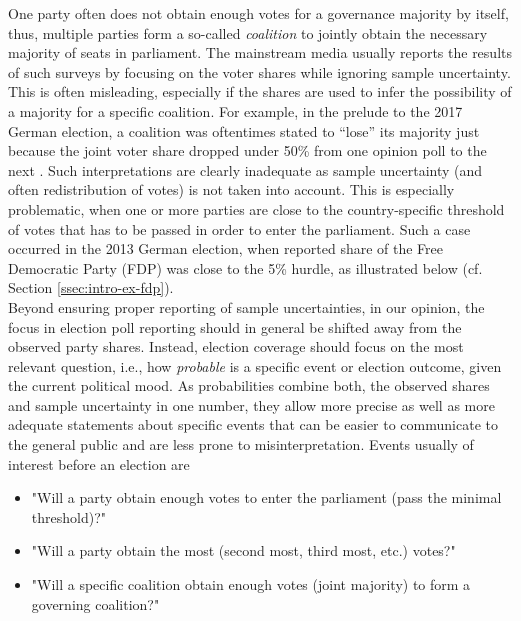 \documentclass[smallcondensed]{svjour3}     %
\begin{document}
One party often does not obtain enough
votes for a governance majority by itself, thus, multiple parties form a so-called
\emph{coalition} to jointly obtain the necessary majority of seats in parliament.
The mainstream media usually reports the results of such surveys by focusing
on the voter shares while ignoring sample uncertainty. This is often misleading,
especially if the shares are used to infer the possibility of a majority for
a specific coalition. For example, in the prelude to the 2017 German election,
a coalition was oftentimes stated to ``lose'' its majority just because the joint
voter share dropped under 50\% from one opinion poll to the next \citep[cf.][]{umfrage_2017}.
Such interpretations are clearly inadequate as sample uncertainty
(and often redistribution of votes) is not taken into account. This is especially
problematic, when one or more parties are close to the country-specific threshold
of votes that has to be passed in order to enter the parliament. Such a case
occurred in the 2013 German election, when reported share of the Free Democratic
Party (FDP) was close to the 5\% hurdle, as illustrated below (cf. Section \ref{ssec:intro-ex-fdp}).\\


Beyond ensuring proper reporting of sample uncertainties, in our opinion, the
focus in election poll reporting should in general be shifted away from the
observed party shares. Instead, election coverage should focus on the most relevant
question, i.e., how {\it probable} is a specific event or election outcome, given
the current political mood.
As probabilities combine both, the observed shares and sample uncertainty in one
number, they allow more precise as well as more adequate statements about specific
events that can be easier to communicate to the general public and are
less prone to misinterpretation.
Events usually of interest before an election are
\begin{itemize}
  \item  "Will a party obtain enough votes to enter the parliament (pass the minimal threshold)?"
  \item  "Will a party obtain the most (second most, third most, etc.) votes?"
  \item "Will a specific coalition obtain enough votes (joint majority) to form a governing coalition?"
\end{itemize}
\end{document}
